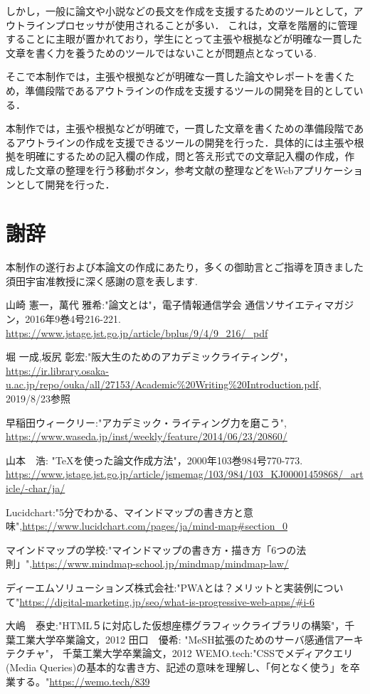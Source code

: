 \documentclass[a4j,12pt]{jarticle}
\begin{document}
しかし，一般に論文や小説などの長文を作成を支援するためのツールとして，アウトラインプロセッサが使用されることが多い．
これは，文章を階層的に管理することに主眼が置かれており，学生にとって主張や根拠などが明確な一貫した文章を書く力を養うためのツールではないことが問題点となっている.

そこで本制作では，主張や根拠などが明確な一貫した論文やレポートを書くため，準備段階であるアウトラインの作成を支援するツールの開発を目的としている．

本制作では，主張や根拠などが明確で，一貫した文章を書くための準備段階であるアウトラインの作成を支援できるツールの開発を行った．具体的には主張や根拠を明確にするための記入欄の作成，問と答え形式での文章記入欄の作成，作成した文章の整理を行う移動ボタン，参考文献の整理などをWebアプリケーションとして開発を行った．

\newpage
\section*{謝辞}
本制作の遂行および本論文の作成にあたり，多くの御助言とご指導を頂きました須田宇宙准教授に深く感謝の意を表します.


 \begin{thebibliography}{99}
山崎 憲一，萬代 雅希:"論文とは"，電子情報通信学会 通信ソサイエティマガジン，2016年9巻4号216-221.
\url{https://www.jstage.jst.go.jp/article/bplus/9/4/9_216/_pdf}

 堀 一成,坂尻 彰宏:"阪大生のためのアカデミックライティング"，
\url{https://ir.library.osaka-u.ac.jp/repo/ouka/all/27153/Academic%20Writing%20Introduction.pdf}, 2019/8/23参照

早稲田ウィークリー:"アカデミック・ライティング力を磨こう",
\url{https://www.waseda.jp/inst/weekly/feature/2014/06/23/20860/}

 山本　浩: "TeXを使った論文作成方法"，2000年103巻984号770-773.
\url{https://www.jstage.jst.go.jp/article/jsmemag/103/984/103_KJ00001459868/_article/-char/ja/}

 Lucidchart:"5分でわかる、マインドマップの書き方と意味",\url{https://www.lucidchart.com/pages/ja/mind-map#section_0}

 マインドマップの学校:"マインドマップの書き方・描き方「6つの法則」",\url{https://www.mindmap-school.jp/mindmap/mindmap-law/}

 ディーエムソリューションズ株式会社:"PWAとは？メリットと実装例について"\url{https://digital-marketing.jp/seo/what-is-progressive-web-apps/#i-6}

大嶋　泰史:"HTML５に対応した仮想座標グラフィックライブラリの構築"，千葉工業大学卒業論文，2012
田口　優希: "MeSH拡張のためのサーバ感通信アーキテクチャ"， 千葉工業大学卒業論文，2012
 WEMO.tech:"CSSでメディアクエリ(Media Queries)の基本的な書き方、記述の意味を理解し、「何となく使う」を卒業する。"\url{https://wemo.tech/839}

\end{thebibliography}
\end{document}
